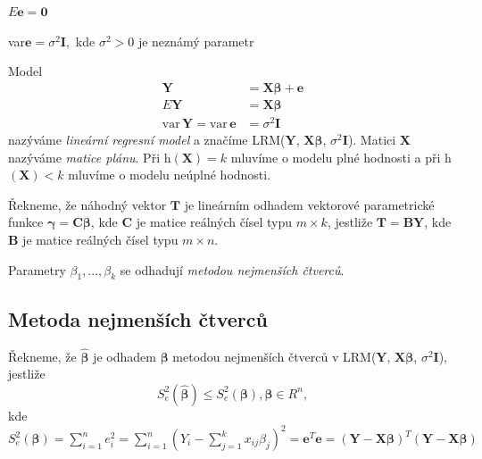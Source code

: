 \begin{predpoklady}
\itemize
    \item $E\mathbf{e}=\mathbf{0}$
    \item var$\mathbf{e}=\sigma^2 \mathbf{I},$ kde $\sigma^2 > 0$ je neznámý parametr 
\end{predpoklady}

\begin{definition}
Model 
\begin{align*}
\mathbf{Y} &= \mathbf{X} \pmb{\beta} + \mathbf{e} \\
E \mathbf{Y} &= \mathbf{X} \pmb{\beta} \\
\mathrm{var} \, \mathbf{Y} = \mathrm{var} \, \mathbf{e} &= \sigma^{2} \mathbf{I} 
\end{align*}
nazýváme \textit{lineární regresní model} a značíme LRM($\mathbf{Y}$, $\mathbf{X} \pmb{\beta}$, $\sigma^2 \mathbf{I}$). Matici $\mathbf{X}$ nazýváme \textit{matice plánu}. Při h$(\mathbf{X})=k$ mluvíme o modelu plné hodnosti a při h$(\mathbf{X})<k$ mluvíme o modelu neúplné hodnosti.
\end{definition}

\begin{definition}
Řekneme, že náhodný vektor $\mathbf{T}$ je lineárním odhadem vektorové parametrické funkce $\pmb{\gamma} = \mathbf{C} \pmb{\beta}$, kde $\mathbf{C}$ je matice reálných čísel typu $m \times k$, jestliže $\mathbf{T} = \mathbf{BY}$, kde $\mathbf{B}$ je matice reálných čísel typu $m \times n$.
\end{definition}

Parametry $\beta_1, ..., \beta_k$ se odhadují \textit{metodou nejmenších čtverců}.

\subsection{Metoda nejmenších čtverců} 
\begin{definition}
Řekneme, že $\pmb{\hat{\beta}}$ je odhadem $\pmb{\beta}$ metodou nejmenších čtverců v LRM($\mathbf{Y}$, $\mathbf{X} \pmb{\beta}$, $\sigma^2 \mathbf{I}$), jestliže 
$$ S_{e}^{2} \left( \pmb{\hat{\beta}} \right) \leq S_{e}^{2} \left( \pmb{\beta} \right), \pmb{\beta} \in R ^ n ,$$ kde $ S_{e}^{2} \left( \pmb{\beta} \right) = \sum^{n}_{i=1} e_{i}^{2} = \sum^{n}_{i=1} \left( Y_i - \sum^{k}_{j=1} x_{ij} \beta_j \right) ^2 = \mathbf{e}^T \mathbf{e} = \left( \mathbf{Y} - \mathbf{X} \pmb{\beta} \right) ^T \left( \mathbf{Y} - \mathbf{X} \pmb{\beta} \right) $ 
\end{definition}

